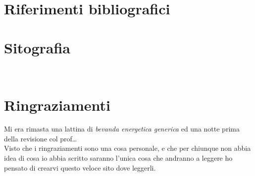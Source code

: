 \documentclass[12pt,a4paper,oneside]{book}
\begin{document}





\renewcommand{\bibsection}{}
\chapter*{Riferimenti bibliografici}
\nocite{*}

\newpage

\chapter*{Sitografia}
\newpage



\newpage~\newpage
\chapter*{Ringraziamenti}
Mi era rimasta una lattina di \textit{bevanda energetica generica} ed una notte prima della revisione col prof\dots\\
Visto che i ringraziamenti sono una cosa personale, e che per chiunque non abbia idea di cosa io abbia scritto saranno l'unica cosa che andranno a leggere ho pensato di crearvi questo veloce sito dove leggerli.

\vspace*{\fill}
\begin{center}
\end{center}
\vspace*{\fill}
\end{document}
